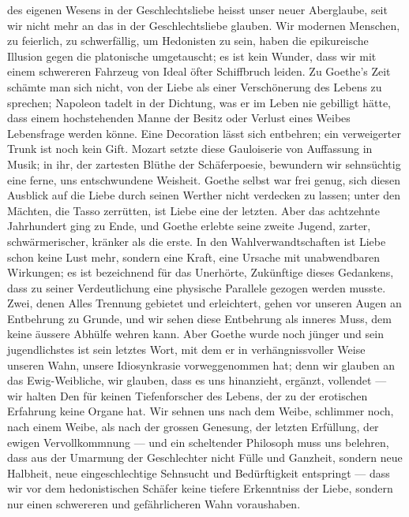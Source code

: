  des eigenen Wesens in der Geschlechtsliebe heisst unser neuer Aberglaube, seit wir nicht mehr an das  in der Geschlechtsliebe glauben. Wir modernen Menschen, zu feierlich, zu schwerfällig, um Hedonisten zu sein, haben die epikureische Illusion gegen die platonische umgetauscht; es ist kein Wunder, dass wir mit einem schwereren Fahrzeug von Ideal öfter Schiffbruch leiden. Zu Goethe’s Zeit schämte man sich nicht, von der Liebe als einer Verschönerung des Lebens zu sprechen; Napoleon tadelt in der Dichtung, was er im Leben nie gebilligt hätte, dass einem hochstehenden Manne der Besitz oder Verlust eines Weibes Lebensfrage werden könne. Eine Decoration lässt sich entbehren; ein verweigerter Trunk ist noch kein Gift. Mozart setzte diese Gauloiserie von Auffassung in Musik; in ihr, der zartesten Blüthe der Schäferpoesie, bewundern wir sehnsüchtig eine ferne, uns entschwundene Weisheit. Goethe selbst war frei genug, sich diesen Ausblick auf die Liebe durch seinen Werther nicht verdecken zu lassen; unter den Mächten, die Tasso zerrütten, ist Liebe eine der letzten. Aber das achtzehnte Jahrhundert ging zu Ende, und Goethe erlebte seine zweite Jugend, zarter, schwärmerischer, kränker als die erste. In den Wahlverwandtschaften ist Liebe schon keine Lust mehr, sondern eine Kraft, eine Ursache mit unabwendbaren Wirkungen; es ist bezeichnend für das Unerhörte, Zukünftige dieses Gedankens, dass zu seiner Verdeutlichung eine physische Parallele gezogen werden musste. Zwei, denen Alles Trennung gebietet und erleichtert, gehen vor unseren Augen an Entbehrung zu Grunde, und wir sehen diese Entbehrung als inneres Muss, dem keine äussere Abhülfe wehren kann. Aber Goethe wurde noch jünger und sein jugendlichstes ist sein letztes Wort, mit dem er in verhängnissvoller Weise unseren Wahn, unsere Idiosynkrasie vorweggenommen hat; denn wir glauben an das Ewig-Weibliche, wir glauben, dass es uns hinanzieht, ergänzt, vollendet — wir halten Den für keinen Tiefenforscher des Lebens, der zu der erotischen Erfahrung keine Organe hat. Wir sehnen uns nach dem Weibe, schlimmer noch, nach einem Weibe, als nach der grossen Genesung, der letzten Erfüllung, der ewigen Vervollkommnung — und ein scheltender Philosoph muss uns belehren, dass aus der Umarmung der Geschlechter nicht Fülle und Ganzheit, sondern neue Halbheit, neue eingeschlechtige Sehnsucht und Bedürftigkeit entspringt — dass wir vor dem hedonistischen Schäfer keine tiefere Erkenntniss der Liebe, sondern nur einen schwereren und gefährlicheren Wahn voraushaben.
\par

